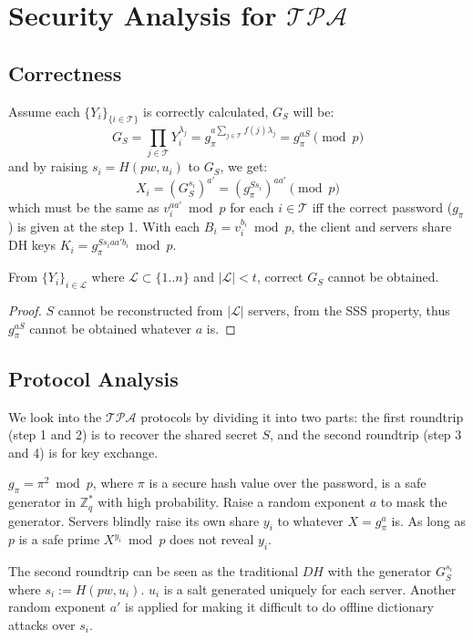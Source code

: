 \section{Security Analysis for $\mathcal{TPA}$}
\label{tpa}
\subsection{Correctness}
Assume each $\{Y_i\}_{\{i \in \mathcal{T}\}}$ is correctly calculated,
$G_S$ will be:
\[
  G_S = \prod_{j \in \mathcal{T}}Y_i^{\lambda_j} = g_{\pi}^{a \sum_{j
      \in \mathcal{T}} f(j) \lambda_j} = g_{\pi}^{aS} \pmod p
\]
and by raising $s_i = H(pw, u_i)$ to $G_S$, we get:
\[
  X_i = (G_S^{s_i})^{a'} = (g_{\pi}^{Ss_i})^{aa'} \pmod p
\]
which must be the same as $v_i^{aa'} \bmod p$ for each $i \in
\mathcal{T}$ iff the correct password ($g_{\pi}$) is given at the
step 1. With each $B_i = v_i^{b_i} \bmod p$, the client and servers
share DH keys $K_i = g_{\pi}^{Ss_iaa'b_i} \bmod p$.

\begin{lemma}
\label{tpa1}
From $\{Y_i\}_{i \in \mathcal{L}}$ where $\mathcal{L} \subset \{1..n\}$ and $|\mathcal{L}| <
t$, correct $G_S$ cannot be obtained.
\end{lemma}

\begin{proof}
$S$ cannot be reconstructed from $|\mathcal{L}|$ servers, from the SSS
  property, thus $g_{\pi}^{aS}$ cannot be obtained whatever $a$ is.
\end{proof}

\subsection{Protocol Analysis}
We look into the $\mathcal{TPA}$ protocols by dividing it into two
parts: the first roundtrip (step 1 and 2) is to recover the shared
secret $S$, and the second roundtrip (step 3 and 4) is for key
exchange.

$g_{\pi} = \pi^2 \bmod p$, where $\pi$ is a secure hash value over the
password, is a safe generator in $\mathbb{Z}^*_q$ with high
probability. Raise a random exponent $a$ to mask the
generator. Servers blindly raise its own share $y_i$ to whatever $X =
g_{\pi}^a$ is. As long as $p$ is a safe prime $X^{y_i} \bmod p$ does
not reveal $y_i$.

The second roundtrip can be seen as the traditional $DH$ with the
generator $G_S^{s_i}$ where $s_i := H(pw, u_i)$. $u_i$ is a salt
generated uniquely for each server. Another random exponent $a'$ is
applied for making it difficult to do offline dictionary attacks over
$s_i$.

